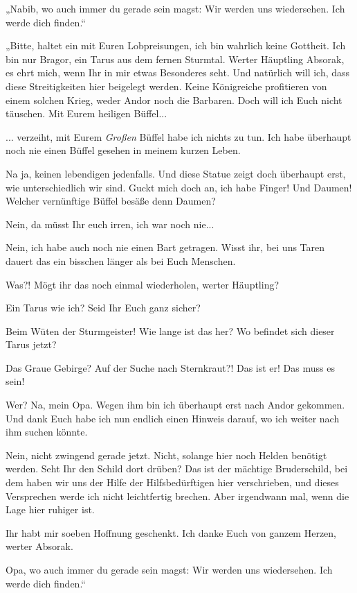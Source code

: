 „Nabib, wo auch immer du gerade sein magst: Wir werden uns wiedersehen. Ich werde dich finden.“\bigskip



„Bitte, haltet ein mit Euren Lobpreisungen, ich bin wahrlich keine Gottheit. Ich bin nur Bragor, ein Tarus aus dem fernen Sturmtal. Werter Häuptling Absorak, es ehrt mich, wenn Ihr in mir etwas Besonderes seht. Und natürlich will ich, dass diese Streitigkeiten hier beigelegt werden. Keine Königreiche profitieren von einem solchen Krieg, weder Andor noch die Barbaren. Doch will ich Euch nicht täuschen. Mit Eurem heiligen Büffel...

... verzeiht, mit Eurem \textit{Großen} Büffel habe ich nichts zu tun. Ich habe überhaupt noch nie einen Büffel gesehen in meinem kurzen Leben.

Na ja, keinen lebendigen jedenfalls. Und diese Statue zeigt doch überhaupt erst, wie unterschiedlich wir sind. Guckt mich doch an, ich habe Finger! Und Daumen! Welcher vernünftige Büffel besäße denn Daumen?

Nein, da müsst Ihr euch irren, ich war noch nie...

Nein, ich habe auch noch nie einen Bart getragen. Wisst ihr, bei uns Taren dauert das ein bisschen länger als bei Euch Menschen.

Was?! Mögt ihr das noch einmal wiederholen, werter Häuptling?

Ein Tarus wie ich? Seid Ihr Euch ganz sicher?

Beim Wüten der Sturmgeister! Wie lange ist das her? Wo befindet sich dieser Tarus jetzt?

Das Graue Gebirge? Auf der Suche nach Sternkraut?! Das ist er! Das muss es sein!

Wer? Na, mein Opa. Wegen ihm bin ich überhaupt erst nach Andor gekommen. Und dank Euch habe ich nun endlich einen Hinweis darauf, wo ich weiter nach ihm suchen könnte.

Nein, nicht zwingend gerade jetzt. Nicht, solange hier noch Helden benötigt werden. Seht Ihr den Schild dort drüben? Das ist der mächtige Bruderschild, bei dem haben wir uns der Hilfe der Hilfsbedürftigen hier verschrieben, und dieses Versprechen werde ich nicht leichtfertig brechen. Aber irgendwann mal, wenn die Lage hier ruhiger ist.

Ihr habt mir soeben Hoffnung geschenkt. Ich danke Euch von ganzem Herzen, werter Absorak.

Opa, wo auch immer du gerade sein magst: Wir werden uns wiedersehen. Ich werde dich finden.“



